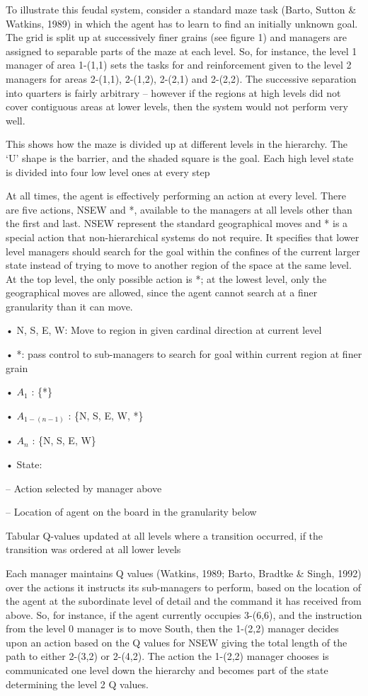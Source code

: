 \documentclass[english]{article}
\begin{document}
To illustrate this feudal system, consider a standard maze task (Barto, Sutton \&
Watkins, 1989) in which the agent has to learn to find an initially unknown goal.
The grid is split up at successively finer grains (see figure 1) and managers are
assigned to separable parts of the maze at each level. So, for instance, the level 1
manager of area 1-(1,1) sets the tasks for and reinforcement given to the level 2
managers for areas 2-(1,1), 2-(1,2), 2-(2,1) and 2-(2,2). The successive separation
into quarters is fairly arbitrary – however if the regions at high levels did not cover
contiguous areas at lower levels, then the system would not perform very well.



This shows how the maze is divided up at
different levels in the hierarchy. The ‘U’ shape is the barrier, and the shaded square
is the goal. Each high level state is divided into four low level ones at every step

At all times, the agent is effectively performing an action at every level. There are five actions, NSEW and *, available to the managers at all levels other than the
first and last. NSEW represent the standard geographical moves and * is a special
action that non-hierarchical systems do not require. It specifies that lower level
managers should search for the goal within the confines of the current larger state
instead of trying to move to another region of the space at the same level. At the
top level, the only possible action is *; at the lowest level, only the geographical
moves are allowed, since the agent cannot search at a finer granularity than it can
move.


• N, S, E, W: Move to region in given
cardinal direction at current level

• *: pass control to sub-managers to
search for goal within current region
at finer grain

• $A_1$ : \{*\}

• $A_{1-(n-1)}$ : \{N, S, E, W, *\}

• $A_n$ : \{N, S, E, W\}

• State:

– Action selected by manager above

– Location of agent on the board in the
granularity below

Tabular Q-values updated at
all levels where a transition
occurred, if the transition
was ordered at all lower
levels

Each manager maintains Q values (Watkins, 1989; Barto, Bradtke \& Singh, 1992)
over the actions it instructs its sub-managers to perform, based on the location of
the agent at the subordinate level of detail and the command it has received from
above. So, for instance, if the agent currently occupies 3-(6,6), and the instruction
from the level 0 manager is to move South, then the 1-(2,2) manager decides upon
an action based on the Q values for NSEW giving the total length of the path to
either 2-(3,2) or 2-(4,2). The action the 1-(2,2) manager chooses is communicated
one level down the hierarchy and becomes part of the state determining the level 2
Q values.
\end{document}
